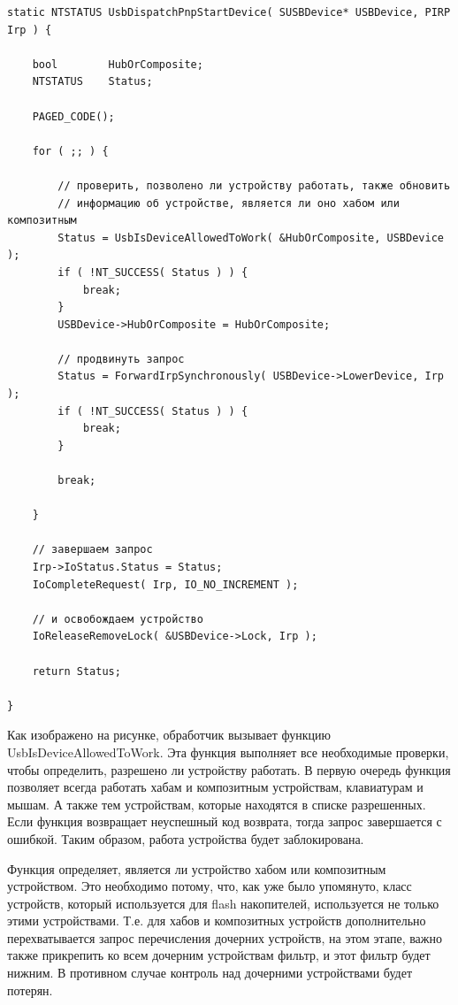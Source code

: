 \documentclass[14pt,a4paper]{article}
\begin{document}
\begin{lstlisting}[language=c caption={Перехват сигнала о запуске работы устройства}]
static NTSTATUS UsbDispatchPnpStartDevice( SUSBDevice* USBDevice, PIRP Irp ) {

	bool		HubOrComposite;
	NTSTATUS	Status;

	PAGED_CODE();

	for ( ;; ) {

		// проверить, позволено ли устройству работать, также обновить
		// информацию об устройстве, является ли оно хабом или композитным
		Status = UsbIsDeviceAllowedToWork( &HubOrComposite, USBDevice );
		if ( !NT_SUCCESS( Status ) ) {
			break;
		}
		USBDevice->HubOrComposite = HubOrComposite;

		// продвинуть запрос
		Status = ForwardIrpSynchronously( USBDevice->LowerDevice, Irp );
		if ( !NT_SUCCESS( Status ) ) {
			break;
		}

		break;

	}

	// завершаем запрос
	Irp->IoStatus.Status = Status;
	IoCompleteRequest( Irp, IO_NO_INCREMENT );

	// и освобождаем устройство
	IoReleaseRemoveLock( &USBDevice->Lock, Irp );

	return Status;

}
\end{lstlisting}

Как изображено на рисунке, обработчик вызывает функцию UsbIsDeviceAllowedToWork. Эта функция выполняет все необходимые проверки, чтобы определить, разрешено ли устройству работать. В первую очередь функция позволяет всегда работать хабам и композитным устройствам, клавиатурам и мышам. А также тем устройствам, которые находятся в списке разрешенных. Если функция возвращает неуспешный код возврата, тогда запрос завершается с ошибкой. Таким образом, работа устройства будет заблокирована. \\

\par Функция определяет, является ли устройство хабом или композитным устройством. Это необходимо потому, что, как уже было упомянуто, класс устройств, который используется для flash накопителей, используется не только этими устройствами. Т.е. для хабов и композитных устройств дополнительно перехватывается запрос перечисления дочерних устройств, на этом этапе, важно также прикрепить ко всем дочерним устройствам фильтр, и этот фильтр будет нижним. В противном случае контроль над дочерними устройствами будет потерян.\\
\end{document}
